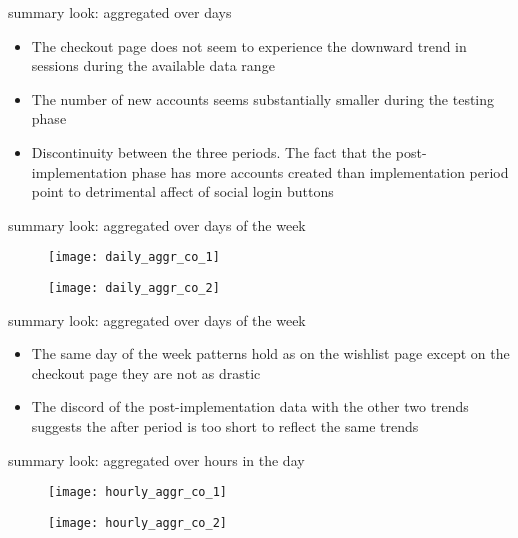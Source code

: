 \documentclass{beamer}
\begin{document}
		\begin{frame}{summary look: aggregated over days}
			\begin{itemize}
				\item The checkout page does not seem to experience the downward trend in sessions during the available data range
				\item The number of new accounts seems substantially smaller during the testing phase
				\item Discontinuity between the three periods. The fact that the post-implementation phase has more accounts created than implementation period point to detrimental affect of social login buttons
			\end{itemize}
		\end{frame}
		
		\begin{frame}{summary look: aggregated over days of the week}
			\begin{figure}[H]
				\centering
				\texttt{[image: daily\_aggr\_co\_1]}
			\end{figure}
			
			\begin{figure}[H]
				\centering
				\texttt{[image: daily\_aggr\_co\_2]}
			\end{figure}
		\end{frame}
		
		\begin{frame}{summary look: aggregated over days of the week}
			\begin{itemize}
				\item The same day of the week patterns hold as on the wishlist page except on the checkout page they are not as drastic
				\item The discord of the post-implementation data with the other two trends suggests the after period is too short to reflect the same trends
			\end{itemize}
		\end{frame}
		
		\begin{frame}{summary look: aggregated over hours in the day}
			\begin{figure}[H]
				\centering
				\texttt{[image: hourly\_aggr\_co\_1]}
			\end{figure}
			
			\begin{figure}[H]
				\centering
				\texttt{[image: hourly\_aggr\_co\_2]}
			\end{figure}
		\end{frame}
		
\end{document}
